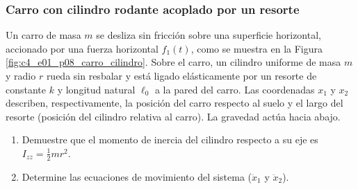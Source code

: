 \subsubsection{Carro con cilindro rodante acoplado por un resorte}

Un carro de masa $m$ se desliza sin fricción sobre una superficie horizontal, accionado por
una fuerza horizontal $f_1(t)$, como se muestra en la Figura \ref{fig:c4_e01_p08_carro_cilindro}.
Sobre el carro, un cilindro uniforme de masa $m$ y radio $r$ rueda sin resbalar y está ligado
elásticamente por un resorte de constante $k$ y longitud natural $\ell_0$ a la pared del carro.
Las coordenadas $x_1$ y $x_2$ describen, respectivamente, la posición del carro respecto al
suelo y el largo del resorte (posición del cilindro relativa al carro). La gravedad actúa hacia
abajo.

\begin{enumerate}
    \item Demuestre que el momento de inercia del cilindro respecto a su eje es
          $I_{zz}=\tfrac12 mr^2$.
    \item Determine las ecuaciones de movimiento del sistema ($\ddot{x}_1$ y $\ddot{x}_2$).
\end{enumerate}

